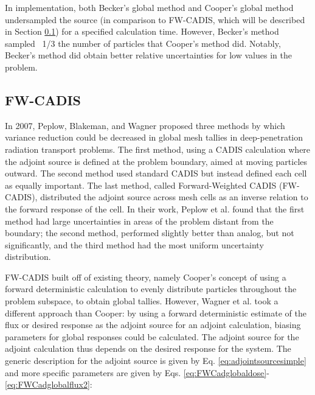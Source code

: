  In implementation, both Becker's global method and Cooper's global method
 undersampled the source (in comparison to FW-CADIS, which will be described in
 Section \ref{subsec:FWCADIS}) for a specified calculation
 time. However, Becker's method sampled ~1/3 the number of particles that
 Cooper's method did. Notably, Becker's method did obtain better relative
 uncertainties for low values in the problem.

\subsection{FW-CADIS}
\label{subsec:FWCADIS}

In 2007, Peplow, Blakeman, and Wagner \cite{peplow_advanced_2007} proposed three
methods by which variance reduction could be decreased in global mesh tallies in
deep-penetration radiation transport problems. The first method, using a CADIS
calculation where the adjoint source is defined at the problem boundary, aimed
at moving particles outward. The second method used standard CADIS but instead
defined each cell as equally important. The last method, called Forward-Weighted
CADIS (FW-CADIS), distributed the adjoint source across mesh cells as an inverse
relation to the forward response of the cell. In their work, Peplow et al. found
that the first method had large uncertainties in areas of the problem distant
from the boundary; the second method, performed slightly better than analog, but
not significantly, and the third method had the most uniform uncertainty
distribution.

FW-CADIS
\cite{wagner_forward-weighted_2007,wagner_forward-weighted_2009,wagner_forward-weighted_2010}
built off of existing theory, namely Cooper's
concept of using a forward deterministic calculation to evenly distribute
particles throughout the problem subspace, to obtain global tallies. However,
Wagner et al. took a different approach than Cooper: by using a forward
deterministic estimate of the flux or desired response as the adjoint source for
an adjoint calculation, biasing parameters for global responses could be
calculated. The adjoint source for the adjoint calculation thus depends on the
desired response for the system. The generic description for the adjoint source
is given by Eq. \eqref{eq:adjointsourcesimple} and more specific parameters are
given by Eqs. \eqref{eq:FWCadglobaldose}-\eqref{eq:FWCadglobalflux2}:

